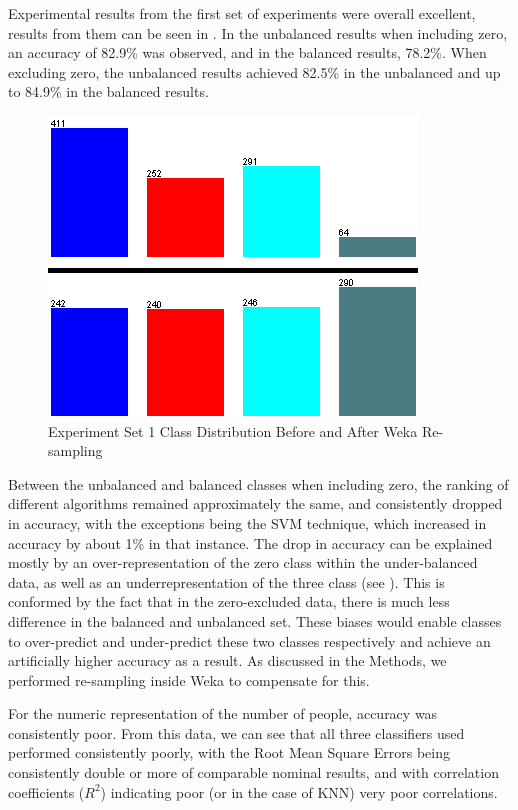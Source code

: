 \documentclass[../thesis/thesis.tex]{subfiles}
\begin{document}
Experimental results from the first set of experiments were overall excellent, results from them can be seen in . In the unbalanced results when including zero, an accuracy of 82.9\% was observed, and in the balanced results, 78.2\%.  When excluding zero, the unbalanced results achieved 82.5\% in the unbalanced and up to 84.9\% in the balanced results.

\begin{figure}
\centering
\includegraphics{../diagrams/temp/resample.png}
\caption{Experiment Set 1 Class Distribution Before and After Weka Re-sampling}
\label{fig:results:resample}
\end{figure}

Between the unbalanced and balanced classes when including zero, the ranking of different algorithms remained approximately the same, and consistently dropped in accuracy, with the exceptions being the SVM technique, which increased in accuracy by about 1\% in that instance. The drop in accuracy can be explained mostly by an over-representation of the zero class within the under-balanced data, as well as an underrepresentation of the three class (see ). This is conformed by the fact that in the zero-excluded data, there is much less difference in the balanced and unbalanced set. These biases would enable classes to over-predict and under-predict these two classes respectively and achieve an artificially higher accuracy as a result. As discussed in the Methods, we performed re-sampling inside Weka to compensate for this.

For the numeric representation of the number of people, accuracy was consistently poor. From this data, we can see that all three classifiers used performed consistently poorly, with the Root Mean Square Errors being consistently double or more of comparable nominal results, and with correlation coefficients ($R^2$) indicating poor (or in the case of KNN) very poor correlations.
\end{document}
